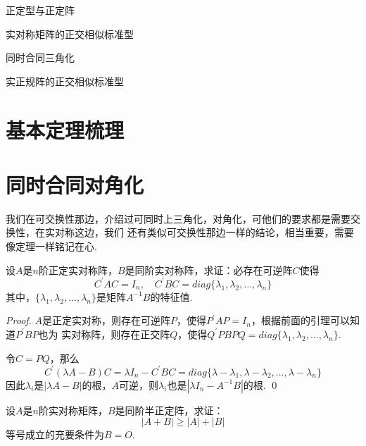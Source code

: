 \begin{introduction}
	\item 正定型与正定阵
	\item 实对称矩阵的正交相似标准型
	\item 同时合同三角化
	\item 实正规阵的正交相似标准型
\end{introduction}

\section{基本定理梳理}

\section{同时合同对角化}

我们在可交换性那边，介绍过可同时上三角化，对角化，可他们的要求都是需要交换性，在实对称这边，我们
还有类似可交换性那边一样的结论，相当重要，需要像定理一样铭记在心.

\begin{lemma}[同时合同对角化]
	设$A$是$n$阶正定实对称阵，$B$是同阶实对称阵，求证：必存在可逆阵$C$使得
	$$
		C^{\prime} A C = I_n,\quad C^{\prime} B C = diag\{ \lambda_1, \lambda_2, \dots, \lambda_n \}
	$$
	其中，$\{ \lambda_1, \lambda_2, \dots, \lambda_n \}$是矩阵$A^{-1}B$的特征值.
\end{lemma}

\begin{proof}
	$A$是正定实对称，则存在可逆阵$P$，使得$P^{\prime} A P=I_n$，根据前面的引理可以知道$P^{\prime} B P$也为
	实对称阵，则存在正交阵$Q$，使得$Q^{\prime} P B P Q=diag\{\lambda_1, \lambda_2,\dots, \lambda_n\}$.

	令$C=PQ$，那么
	$$
		C^\prime (\lambda A - B) C  = \lambda I_n - C^\prime B C = diag\{ \lambda - \lambda_1, \lambda - \lambda_2,\dots, \lambda - \lambda_n \}  
	$$
	因此$\lambda_i$是$|\lambda A - B |$的根，$A$可逆，则$\lambda_i$也是$|\lambda I_n - A^{-1}B|$的根.
	\qed{}
\end{proof}

\begin{proposition}
	设$A$是$n$阶实对称矩阵，$B$是同阶半正定阵，求证：
	$$
		| A + B | \geq | A | + | B |
	$$
	等号成立的充要条件为$B=O$.
\end{proposition}

